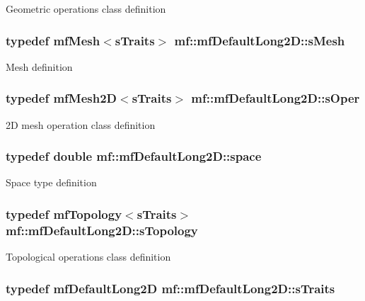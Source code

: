 \label{structmf_1_1mfDefaultLong2D_aa689949101848a8cc3ec832e0ddab81b}
Geometric operations class definition \hypertarget{structmf_1_1mfDefaultLong2D_af343d9f5a2e8f7c633a0363b018892ce}{
\subsubsection[{sMesh}]{\setlength{\rightskip}{0pt plus 5cm}typedef {\bf mfMesh}$<${\bf sTraits}$>$ {\bf mf::mfDefaultLong2D::sMesh}}}
\label{structmf_1_1mfDefaultLong2D_af343d9f5a2e8f7c633a0363b018892ce}
Mesh definition \hypertarget{structmf_1_1mfDefaultLong2D_a28659b4baf6e65094669073068626fae}{
\subsubsection[{sOper}]{\setlength{\rightskip}{0pt plus 5cm}typedef {\bf mfMesh2D}$<${\bf sTraits}$>$ {\bf mf::mfDefaultLong2D::sOper}}}
\label{structmf_1_1mfDefaultLong2D_a28659b4baf6e65094669073068626fae}
2D mesh operation class definition \hypertarget{structmf_1_1mfDefaultLong2D_a7010255ab9efbc1c3760ebb1b26df7ab}{
\subsubsection[{space}]{\setlength{\rightskip}{0pt plus 5cm}typedef double {\bf mf::mfDefaultLong2D::space}}}
\label{structmf_1_1mfDefaultLong2D_a7010255ab9efbc1c3760ebb1b26df7ab}
Space type definition \hypertarget{structmf_1_1mfDefaultLong2D_a53139dd43bad6fbea119cfe3877ea2de}{
\subsubsection[{sTopology}]{\setlength{\rightskip}{0pt plus 5cm}typedef {\bf mfTopology}$<${\bf sTraits}$>$ {\bf mf::mfDefaultLong2D::sTopology}}}
\label{structmf_1_1mfDefaultLong2D_a53139dd43bad6fbea119cfe3877ea2de}
Topological operations class definition \hypertarget{structmf_1_1mfDefaultLong2D_abfeb7f123426df4ccc4af7c4ee294680}{
\subsubsection[{sTraits}]{\setlength{\rightskip}{0pt plus 5cm}typedef {\bf mfDefaultLong2D} {\bf mf::mfDefaultLong2D::sTraits}}}
